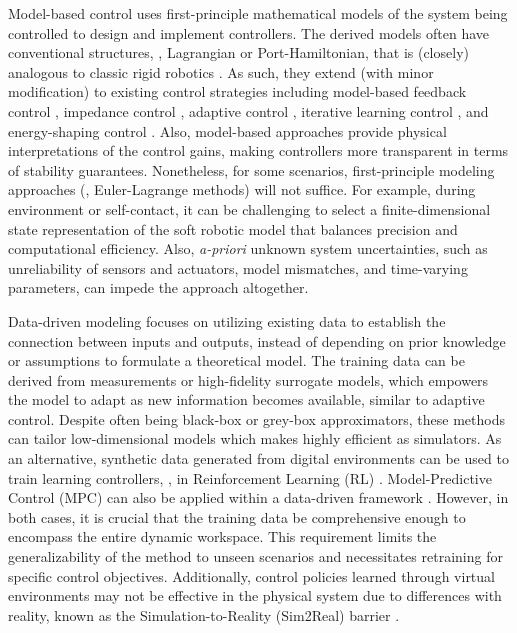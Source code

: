 Model-based control uses first-principle mathematical models of the system being controlled to design and implement controllers. The derived models often have conventional structures, \eg, Lagrangian or Port-Hamiltonian, that is (closely) analogous to classic rigid robotics \cite{Spong2006,Murray1994,Armanini2023,DellaSantina2021}. As such, they extend (with minor modification) to existing control strategies including model-based feedback control \cite{Falkenhahn2015,Milana2021}, impedance control \cite{DellaSantina2020}, adaptive control \cite{Trumic2020,Kazemipour2022May}, iterative learning control \cite{Hofer2019}, and energy-shaping control \cite{Franco2020,Franco2022,Chang2023,Borja2022Apr}. Also, model-based approaches provide physical interpretations of the control gains, making controllers more transparent in terms of stability guarantees. Nonetheless, for some scenarios, first-principle modeling approaches (\ie, Euler-Lagrange methods) will not suffice. For example, during environment or self-contact, it can be challenging to select a finite-dimensional state representation of the soft robotic model that balances precision and computational efficiency. Also, \textit{a-priori} unknown system uncertainties, such as unreliability of sensors and actuators, model mismatches, and time-varying parameters, can impede the approach altogether.

\par Data-driven modeling focuses on utilizing existing data to establish the connection between inputs and outputs, instead of depending on prior knowledge or assumptions to formulate a theoretical model. The training data can be derived from measurements or high-fidelity surrogate models, which empowers the model to adapt as new information becomes available, similar to adaptive control. Despite often being black-box or grey-box approximators, these methods can tailor low-dimensional models which makes highly efficient as simulators. As an alternative, synthetic data generated from digital environments can be used to train learning controllers, \eg, in Reinforcement Learning (RL) \cite{Schegg2022,Tekinalp2022}. Model-Predictive Control (MPC) can also be applied within a data-driven framework \cite{Hyatt2020,Bruder2019}. However, in both cases, it is crucial that the training data be comprehensive enough to encompass the entire dynamic workspace. This requirement limits the generalizability of the method to unseen scenarios and necessitates retraining for specific control objectives. Additionally, control policies learned through virtual environments may not be effective in the physical system due to differences with reality, known as the Simulation-to-Reality (Sim2Real) barrier \cite{Kriegman2020}.

